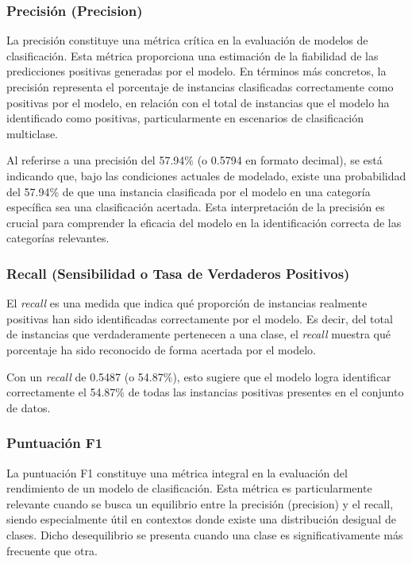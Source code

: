 \subsubsection{Precisión (Precision)}
La precisión constituye una métrica crítica en la evaluación de modelos de clasificación. Esta métrica proporciona una estimación de la fiabilidad de las predicciones positivas generadas por el modelo. En términos más concretos, la precisión representa el porcentaje de instancias clasificadas correctamente como positivas por el modelo, en relación con el total de instancias que el modelo ha identificado como positivas, particularmente en escenarios de clasificación multiclase.

Al referirse a una precisión del 57.94\% (o 0.5794 en formato decimal), se está indicando que, bajo las condiciones actuales de modelado, existe una probabilidad del 57.94\% de que una instancia clasificada por el modelo en una categoría específica sea una clasificación acertada. Esta interpretación de la precisión es crucial para comprender la eficacia del modelo en la identificación correcta de las categorías relevantes.

\subsubsection{Recall (Sensibilidad o Tasa de Verdaderos Positivos)}
El \textit{recall} es una medida que indica qué proporción de instancias realmente positivas han sido identificadas correctamente por el modelo. Es decir, del total de instancias que verdaderamente pertenecen a una clase, el \textit{recall} muestra qué porcentaje ha sido reconocido de forma acertada por el modelo.

Con un \textit{recall} de 0.5487 (o 54.87\%), esto sugiere que el modelo logra identificar correctamente el 54.87\% de todas las instancias positivas presentes en el conjunto de datos.

\subsubsection{Puntuación F1}

La puntuación F1 constituye una métrica integral en la evaluación del rendimiento de un modelo de clasificación. Esta métrica es particularmente relevante cuando se busca un equilibrio entre la precisión (precision) y el recall, siendo especialmente útil en contextos donde existe una distribución desigual de clases. Dicho desequilibrio se presenta cuando una clase es significativamente más frecuente que otra.

